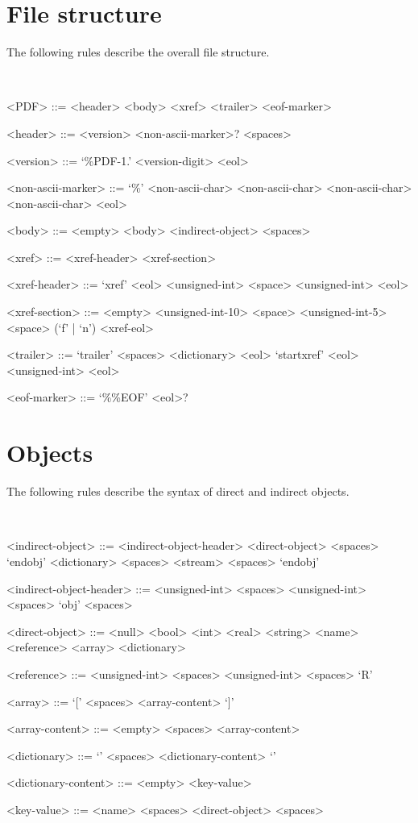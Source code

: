 \section{File structure}
\label{gram:file}

The following rules describe the overall file structure.

~

\begin{grammar}
<PDF> ::= <header> <body> <xref> <trailer> <eof-marker>

<header> ::= <version> <non-ascii-marker>? <spaces>

<version> ::= `\%PDF-1.' <version-digit> <eol>

<non-ascii-marker> ::= `\%' <non-ascii-char> <non-ascii-char> <non-ascii-char> <non-ascii-char> <eol>

<body> ::= <empty>
\alt <body> <indirect-object> <spaces>

<xref> ::= <xref-header> <xref-section>

<xref-header> ::= `xref' <eol> <unsigned-int> <space> <unsigned-int> <eol>

<xref-section> ::= <empty>
 <unsigned-int-10> <space> <unsigned-int-5> <space> (`f' | `n') <xref-eol>

<trailer> ::= `trailer' <spaces> <dictionary> <eol> `startxref' <eol> <unsigned-int> <eol>

<eof-marker> ::= `\%\%EOF' <eol>?
\end{grammar}


\section{Objects}
\label{gram:objects}

The following rules describe the syntax of direct and indirect objects.

~

\begin{grammar}
<indirect-object> ::= <indirect-object-header> <direct-object> <spaces> `endobj'
 <dictionary> <spaces> <stream> <spaces> `endobj'

<indirect-object-header> ::= <unsigned-int> <spaces> <unsigned-int> <spaces> `obj' <spaces>

<direct-object> ::= <null>
\alt <bool>
\alt <int>
\alt <real>
\alt <string>
\alt <name>
\alt <reference>
\alt <array>
\alt <dictionary>

<reference> ::= <unsigned-int> <spaces> <unsigned-int> <spaces> `R'

<array> ::= `[' <spaces> <array-content> `]'

<array-content> ::= <empty>
 <spaces> <array-content>

<dictionary> ::= `\lless' <spaces> <dictionary-content> `\ggreater'

<dictionary-content> ::= <empty>
 <key-value>

<key-value> ::= <name> <spaces> <direct-object> <spaces>
\end{grammar}

